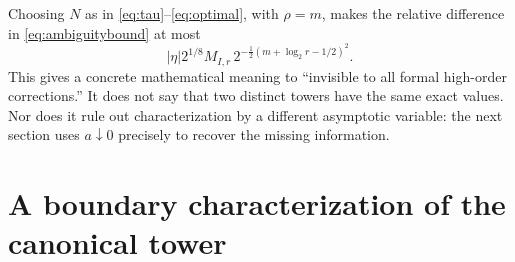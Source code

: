 \documentclass[11pt,letterpaper]{article}
\numberwithin{equation}{section}
\theoremstyle{definition}
\theoremstyle{remark}
\begin{document}
Choosing $N$ as in \eqref{eq:tau}--\eqref{eq:optimal}, with $\rho=m$,
makes the relative difference in \eqref{eq:ambiguitybound} at most
\begin{equation}\label{eq:ambiguityoptimal}
 |\eta|2^{1/8}M_{I,r}\,
       2^{-\frac12(m+\log_2r-1/2)^2}.
\end{equation}
This gives a concrete mathematical meaning to ``invisible to all formal
high-order corrections.'' It does not say that two distinct towers have
the same exact values. Nor does it rule out characterization by a different
asymptotic variable: the next section uses $a\downarrow0$ precisely to
recover the missing information.

\section{A boundary characterization of the canonical tower}\label{sec:uniqueness}
\end{document}
